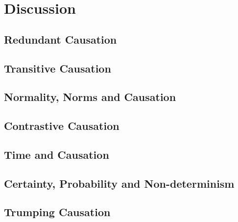 \documentclass[11pt,a4paper]{book}
\theoremstyle{definition}
\theoremstyle{definition}
\theoremstyle{definition}
\theoremstyle{remark}
\begin{document}
%
%

%



\section{Discussion}

\subsection{Redundant Causation}


\subsection{Transitive Causation}

\subsection{Normality, Norms and Causation}
\subsection{Contrastive Causation}

\subsection{Time and Causation}

\subsection{Certainty, Probability and Non-determinism}

\subsection{Trumping Causation}
\end{document}
